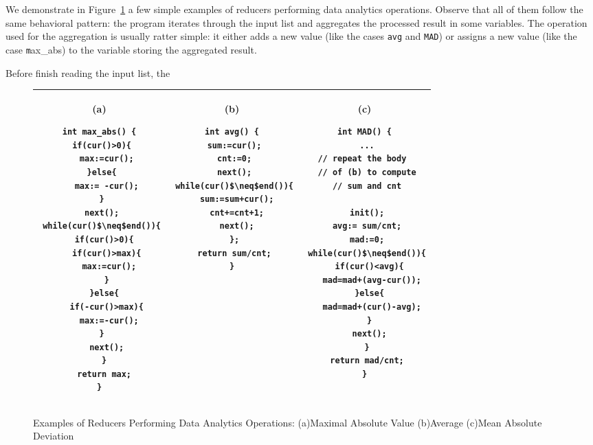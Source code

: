 \documentclass[runningheads,a4paper]{llncs}
\begin{document}
We demonstrate in Figure~\ref{fig:examples} a few simple examples of reducers performing data analytics operations. Observe that all of them follow the same behavioral pattern: the program iterates through the input list and aggregates the processed result in some variables. The operation used for the aggregation is usually ratter simple: it either adds a new value (like the cases \texttt{avg} and \texttt{MAD}) or assigns a new value (like the case {\texttt max\_abs}) to the variable storing the aggregated result. 

Before finish reading the input list, the 
\begin{figure}
	\centering
	\lstset{language=C,
		basicstyle=\ttfamily\scriptsize}
	\begin{tabular}{|c|c|c|}
\hline
		\begin{minipage}[t]{0.28\textwidth}
			(a)
			\begin{lstlisting}[mathescape=true]
int max_abs() {
 if(cur()>0){
   max:=cur();
 }else{
   max:= -cur();
 }
 next();
 while(cur()$\neq$end()){
  if(cur()>0){
   if(cur()>max){
    max:=cur();
   }
  }else{
   if(-cur()>max){
    max:=-cur();
   }  
   next();
  }
  return max;
}
			\end{lstlisting}
		\end{minipage}&
		\begin{minipage}[t]{0.28\textwidth}
			(b)
			\begin{lstlisting}[mathescape=true]
int avg() {
 sum:=cur();
 cnt:=0;
 next();
 while(cur()$\neq$end()){
  sum:=sum+cur();
  cnt+=cnt+1;
  next();
 };
 return sum/cnt;
}
			\end{lstlisting}
		\end{minipage}&
		\begin{minipage}[t]{0.29\textwidth}
		(c)
			\begin{lstlisting}[mathescape=true]
int MAD() {
 ...
 // repeat the body  
 // of (b) to compute
 // sum and cnt
 
 init();
 avg:= sum/cnt;
 mad:=0;
 while(cur()$\neq$end()){
  if(cur()<avg){
   mad=mad+(avg-cur());
  }else{
   mad=mad+(cur()-avg);
  }
  next();
 }
 return mad/cnt;
}
			\end{lstlisting}
		\end{minipage}\\
\hline		
	\end{tabular}
	\label{fig:examples}
	\caption{Examples of Reducers Performing Data Analytics Operations: (a)Maximal Absolute Value (b)Average (c)Mean Absolute Deviation}
\end{figure}
\end{document}
